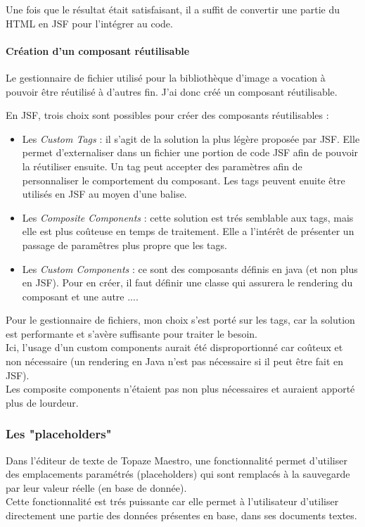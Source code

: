 Une fois que le résultat était satisfaisant, il a suffit de convertir une partie du HTML en JSF pour l'intégrer au code.

\paragraph*{Création d'un composant réutilisable}
Le gestionnaire de fichier utilisé pour la bibliothèque d'image a vocation à pouvoir être réutilisé à d'autres fin.
J'ai donc créé un composant réutilisable.

En JSF, trois choix sont possibles pour créer des composants réutilisables : 
\begin{itemize}
\item Les \textit{Custom Tags} : il s'agit de la solution la plus légère proposée par JSF. Elle permet d'externaliser dans un fichier une portion de code JSF afin de pouvoir la réutiliser ensuite. Un tag peut accepter des paramètres afin de personnaliser le comportement du composant. Les tags peuvent enuite être utilisés en JSF au moyen d'une balise.
\item Les \textit{Composite Components} : cette solution est trés semblable aux tags, mais elle est plus coûteuse en temps de traitement. Elle a l'intérêt de présenter un passage de paramêtres plus propre que les tags.
\item Les \textit{Custom Components} : ce sont des composants définis en java (et non plus en JSF). Pour en créer, il faut définir une classe qui assurera le rendering du composant et une autre .... %
\end{itemize}

Pour le gestionnaire de fichiers, mon choix s'est porté sur les tags, car la solution est performante et s'avère suffisante pour traiter le besoin.\\
Ici, l'usage d'un custom components aurait été disproportionné car coûteux et non nécessaire (un rendering en Java n'est pas nécessaire si il peut être fait en JSF).\\
Les composite components n'étaient pas non plus nécessaires et auraient apporté plus de lourdeur.

\subsubsection{Les "placeholders"}
Dans l'éditeur de texte de Topaze Maestro, une fonctionnalité permet d'utiliser des emplacements paramétrés (placeholders) qui sont remplacés à la sauvegarde par leur valeur réelle (en base de donnée). \\
Cette fonctionnalité est trés puissante car elle permet à l'utilisateur d'utiliser directement une partie des données présentes en base, dans ses documents textes. \\

